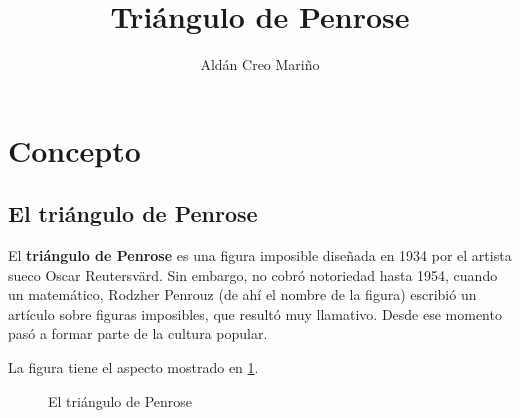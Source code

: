 \documentclass[a4paper,12pt]{article}
\title{Triángulo de Penrose}
\date{}
\author{Aldán Creo Mariño}
\begin{document}
\maketitle

\newpage
\tableofcontents
\newpage

\section{Concepto}
\subsection{El triángulo de Penrose}

El \textbf{triángulo de Penrose} es una figura imposible diseñada en 1934 por el artista sueco Oscar Reutersvärd. Sin embargo, no cobró notoriedad hasta 1954, cuando un matemático, Rodzher Penrouz (de ahí el nombre de la figura) escribió un artículo sobre figuras imposibles, que resultó muy llamativo. Desde ese momento pasó a formar parte de la cultura popular.

La figura tiene el aspecto mostrado en \ref{imagen_triangulo}.

\begin{figure}[h]
    \centering
    \caption{El triángulo de Penrose} \label{imagen_triangulo}
\end{figure}
\end{document}
